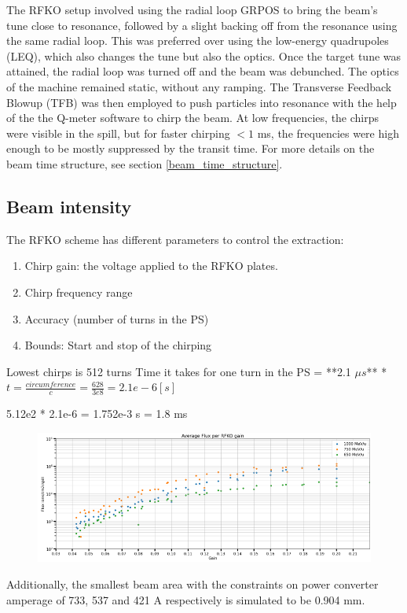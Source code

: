 The RFKO setup involved using the radial loop GRPOS to bring the beam's tune close to resonance, followed by a slight backing off from the resonance using the same radial loop. This was preferred over using the low-energy quadrupoles (LEQ), which also changes the tune but also the optics. Once the target tune was attained, the radial loop was turned off and the beam was debunched. The optics of the machine remained static, without any ramping. The Transverse Feedback Blowup (TFB) was then employed to push particles into resonance with the help of the the Q-meter software to chirp the beam. At low frequencies, the chirps were visible in the spill, but for faster chirping $< 1$ ms, the frequencies were high enough to be mostly suppressed by the transit time. For more details on the beam time structure, see section \ref{beam_time_structure}.

\subsection{Beam intensity}
\label{beam_intensity}



The RFKO scheme has different parameters to control the extraction:
\begin{enumerate}
    \item Chirp gain: the voltage applied to the RFKO plates.
    \item Chirp frequency range
    \item Accuracy (number of turns in the PS)
    \item Bounds: Start and stop of the chirping
\end{enumerate}

Lowest chirps is 512 turns
Time it takes for one turn in the PS = **2.1 $\mu s$**
* $t = \frac{circumference}{c} = \frac{628}{3e8} = 2.1e-6 [s]$

5.12e2 * 2.1e-6 = 1.752e-3 s = 1.8 ms

\begin{figure}[!htb]
\includegraphics[width=1.0\textwidth]{images/BEAM_INTENSITY/flux_vs_gain.png}
\end{figure}


Additionally, the smallest beam area with the constraints on power converter amperage of 733, 537 and 421 A respectively is simulated to be 0.904 mm.

